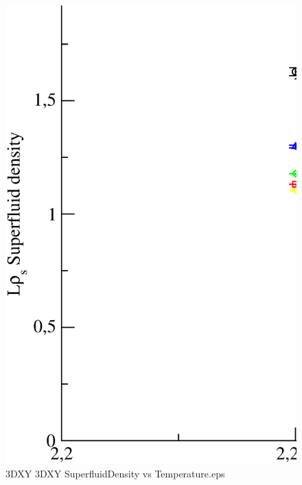 \begin{figure}[!htpb]
  \centering
  \includegraphics[width=\textwidth]{./plots/3DXY/3DXY_SuperfluidDensity_vs_Temperature.eps}
  \caption{3DXY 3DXY SuperfluidDensity vs Temperature.eps}
\end{figure}

